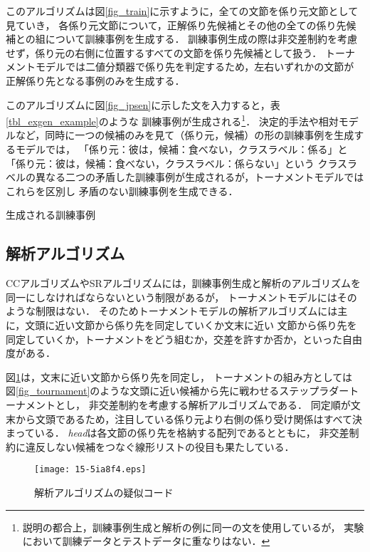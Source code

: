\documentclass[japanese]{jnlp_1.4}
\begin{document}
このアルゴリズムは図\ref{fig_train}に示すように，全ての文節を係り元文節として見ていき，
\pagebreak
各係り元文節について，正解係り先候補とその他の全ての係り先候補との組について訓練事例を生成する．
訓練事例生成の際は非交差制約を考慮せず，係り元の右側に位置するすべての文節を係り先候補として扱う．
トーナメントモデルでは二値分類器で係り先を判定するため，左右いずれかの文節が
正解係り先となる事例のみを生成する．


このアルゴリズムに図\ref{fig_jpsen}に示した文を入力すると，表\ref{tbl_exgen_example}のような
訓練事例が生成される\footnote{
	説明の都合上，訓練事例生成と解析の例に同一の文を使用しているが，
	実験において訓練データとテストデータに重なりはない．}．
決定的手法や相対モデルなど，同時に一つの候補のみを見て（係り元，候補）の形の訓練事例を生成するモデルでは，
「係り元：彼は，候補：食べない，クラスラベル：係る」と「係り元：彼は，候補：食べない，クラスラベル：係らない」という
クラスラベルの異なる二つの矛盾した訓練事例が生成されるが，トーナメントモデルではこれらを区別し
矛盾のない訓練事例を生成できる．


\begin{table}[t]
\caption{生成される訓練事例}
\begin{center}

\end{center}
\label{tbl_exgen_example}
\end{table}


\subsection{解析アルゴリズム}
\label{sec:parsing_algorithm}

CCアルゴリズムやSRアルゴリズムには，訓練事例生成と解析のアルゴリズムを同一にしなければならないという制限があるが，
トーナメントモデルにはそのような制限はない．
そのためトーナメントモデルの解析アルゴリズムには主に，文頭に近い文節から係り先を同定していくか文末に近い
文節から係り先を同定していくか，トーナメントをどう組むか，交差を許すか否か，といった自由度がある．

図\ref{fig_test}は，文末に近い文節から係り先を同定し，
トーナメントの組み方としては
図\ref{fig_tournament}のような文頭に近い候補から先に戦わせるステップラダートーナメントとし，
非交差制約を考慮する解析アルゴリズムである．
同定順が文末から文頭であるため，注目している係り元より右側の係り受け関係はすべて決まっている．
{\it head}は各文節の係り先を格納する配列であるとともに，
非交差制約に違反しない候補をつなぐ線形リストの役目も果たしている．


\begin{figure}[t]
\begin{center}
\texttt{[image: 15-5ia8f4.eps]}
\end{center}
\caption{解析アルゴリズムの疑似コード}
\label{fig_test}
\end{figure}
\end{document}
